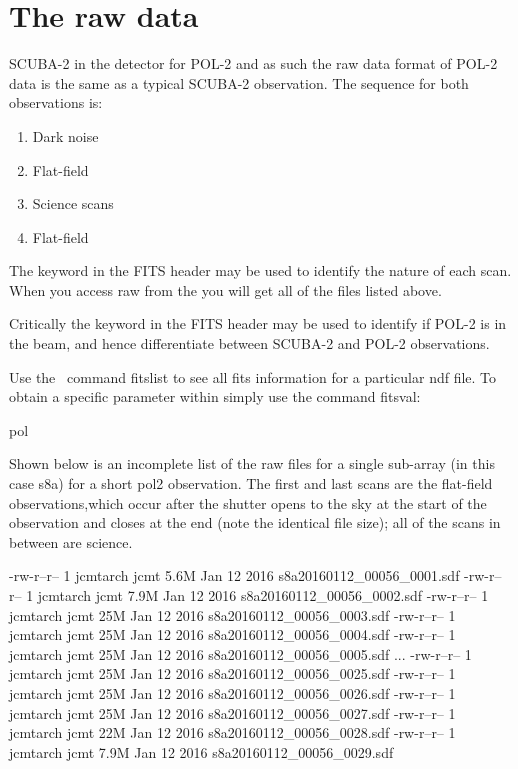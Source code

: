 \section{The raw data}
\label{sec:rawdata}
SCUBA-2 in the detector for POL-2 and as such the raw data format of POL-2 data is
the same as a typical SCUBA-2 observation. The sequence for both observations is:

\begin{enumerate}\itemsep-0.2em
\item Dark noise
\item Flat-field
\item Science scans
\item Flat-field
\end{enumerate}

The  keyword in the FITS header may be used to identify the nature of each scan.  
When you access raw from the  you
will get all of the files listed above. 


Critically the  keyword in the FITS header may be used to
identify if POL-2 is in the beam, and hence differentiate between SCUBA-2 
and POL-2 observations.


\begin{tip}
Use the  \Kappa\ command fitslist to see all fits information for a particular ndf file. 
To obtain a specific parameter within simply use the command fitsval:
\begin{terminalv}
pol
\end{terminalv}
\end{tip}

Shown below is an incomplete list of the raw files for a single sub-array (in this
case s8a) for a short pol2 observation. The first and last
scans are the flat-field observations,which occur after the shutter
opens to the sky at the start of the observation and closes at the end
(note the identical file size); all of the scans in between are
science.


\begin{terminalv}
\end{terminalv}

\begin{terminalv}
-rw-r--r-- 1 jcmtarch jcmt 5.6M Jan 12  2016 s8a20160112_00056_0001.sdf
-rw-r--r-- 1 jcmtarch jcmt 7.9M Jan 12  2016 s8a20160112_00056_0002.sdf
-rw-r--r-- 1 jcmtarch jcmt  25M Jan 12  2016 s8a20160112_00056_0003.sdf
-rw-r--r-- 1 jcmtarch jcmt  25M Jan 12  2016 s8a20160112_00056_0004.sdf
-rw-r--r-- 1 jcmtarch jcmt  25M Jan 12  2016 s8a20160112_00056_0005.sdf
...
-rw-r--r-- 1 jcmtarch jcmt  25M Jan 12  2016 s8a20160112_00056_0025.sdf
-rw-r--r-- 1 jcmtarch jcmt  25M Jan 12  2016 s8a20160112_00056_0026.sdf
-rw-r--r-- 1 jcmtarch jcmt  25M Jan 12  2016 s8a20160112_00056_0027.sdf
-rw-r--r-- 1 jcmtarch jcmt  22M Jan 12  2016 s8a20160112_00056_0028.sdf
-rw-r--r-- 1 jcmtarch jcmt 7.9M Jan 12  2016 s8a20160112_00056_0029.sdf
\end{terminalv}

